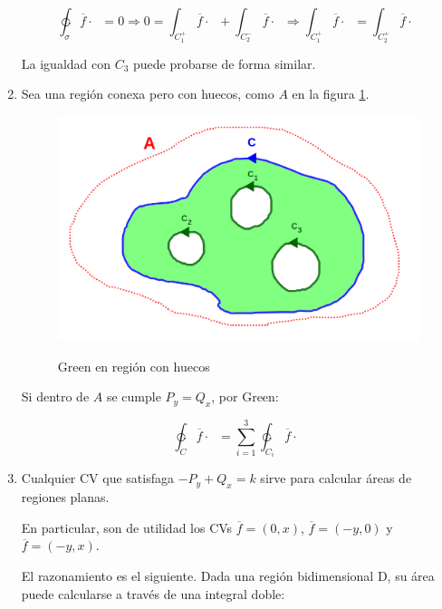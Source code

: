 \documentclass{article}
\begin{document}
\begin{enumerate}
\begin{equation}
\ointctrclockwise_{\sigma} \overline{f} \cdot \mathop{\overline{d\sigma}} = 0 \Rightarrow 0 = \int_{C_1^+} \overline{f} \cdot \mathop{\overline{dC_1}} + \int_{C_2^-} \overline{f} \cdot \mathop{\overline{dC_2}} \Rightarrow \int_{C_1^+} \overline{f} \cdot \mathop{\overline{dC_1}} = \int_{C_2^+} \overline{f} \cdot \mathop{\overline{dC_2}}
\end{equation}

La igualdad con $C_3$ puede probarse de forma similar.

\item Sea una región conexa pero con huecos, como $A$ en la figura \ref{fig:greenhuecos}.

\begin{figure}[ht]
\centering
\caption{Green en región con huecos}
\includegraphics[scale=1]{img/teoremas/green_huecos.png}
\label{fig:greenhuecos}
\end{figure}

Si dentro de $A$ se cumple $P_y = Q_x$, por Green:

\begin{equation}
\ointctrclockwise_{C} \overline{f} \cdot \mathop{\overline{dC}} = \sum_{i=1}^3 \ointctrclockwise_{C_i} \overline{f} \cdot \mathop{\overline{dC_i}}
\end{equation}

\item Cualquier CV que satisfaga $-P_y + Q_x = k$ sirve para calcular áreas de regiones planas.

En particular, son de utilidad los CVs $\overline{f} = (0, x)$, $\overline{f} = (-y, 0)$ y $\overline{f} = (-y, x)$.
 
El razonamiento es el siguiente. Dada una región bidimensional D, su área puede calcularse a través de una integral doble: 


\end{enumerate}
\end{document}

